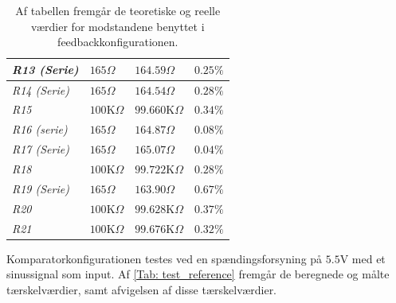 \begin{table}[H]
\begin{tabular}{|l|l|l|l|}
\textit{R13 (Serie)}    & $165\Omega$              & $164.59\Omega$      & $0.25\%$           \\ \hline
\textit{R14 (Serie)}    & $165\Omega$              & $164.54\Omega$      & $0.28\%$           \\ \hline
\textit{R15}            & $100$K$\Omega$           & $99.660$K$\Omega$   & $0.34\%$           \\ \hline
\textit{R16 (serie)}    & $165\Omega$              & $164.87\Omega$      & $0.08\%$           \\ \hline
\textit{R17 (Serie)}    & $165\Omega$              & $165.07\Omega$      & $0.04\%$           \\ \hline
\textit{R18}            & $100$K$\Omega$           & $99.722$K$\Omega$   & $0.28\%$           \\ \hline
\textit{R19 (Serie)}    & $165\Omega$              & $163.90\Omega$      & $0.67\%$           \\ \hline
\textit{R20}            & $100$K$\Omega$           & $99.628$K$\Omega$   & $0.37\%$           \\ \hline
\textit{R21}            & $100$K$\Omega$           & $99.676$K$\Omega$   & $0.32\%$           \\ \hline
\end{tabular}
\caption{Af tabellen fremgår de teoretiske og reelle værdier for modstandene benyttet i feedbackkonfigurationen.}
\label{Tab:komparator_modstande}
\end{table}
\noindent Komparatorkonfigurationen testes ved en spændingsforsyning på $5.5$V med et sinussignal som input. Af \ref{Tab: test_reference} fremgår de beregnede og målte tærskelværdier, samt afvigelsen af disse tærskelværdier. 

